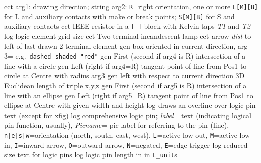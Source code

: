   {cct}
  {arg1: drawing direction; string arg2: {\tt R}=right orientation,
   one or more {\tt L[M][B]} for L and auxiliary contacts with make or break
   points; {\tt S[M][B]} for S and auxiliary contacts
   }
%
  {cct}
  {IEEE resistor in a {\tt [ ]} block with Kelvin taps {\sl T1} and {\sl T2}
   }
%
  {log}
  {logic-element grid size}
  {cct}
  {Two-terminal incandescent lamp
   }
  {cct}
  {arrow {\sl dist} to left of last-drawn 2-terminal element
   }
  {gen}
  {box oriented in current direction, arg 3= e.g.\ {\tt dashed shaded "red"}}
  {gen}
  { First (second if arg4 is R) intersection of a line with a circle}
  {gen}
  { Left (right if arg4=R) tangent point of line
     from Pos1 to circle at Centre with radius arg3}
  {gen}
  {left with respect to current direction }
  {3D}
  {Euclidean length of triple x,y,z}
  {gen}
  { First (second if arg5 is R) intersection of a line with an ellipse}
  {gen}
  { Left (right if arg5=R) tangent point of line
     from Pos1 to ellipse at Centre with given width and height}
  {log}
  {draws an overline over logic-pin text (except for xfig)}
  {log}
  {comprehensive logic pin;
   {\sl label}= text (indicating logical pin function, usually),
   {\sl Picname}= pic label for referring to the pin (line),
   {\tt n|e|s|w}=orientation (north, south, east, west),
   {\tt L}=active low out,
   {\tt M}=active low in,
   {\tt I}=inward arrow,
   {\tt O}=outward arrow,
   {\tt N}=negated,
   {\tt E}=edge trigger}
  {log}
  {reduced-size text for logic pins}
  {log}
  {logic pin length in in {\tt L\_unit}s}
